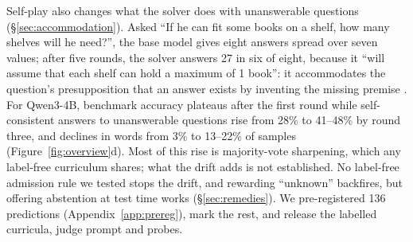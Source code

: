 Self-play also changes what the solver does with unanswerable questions (\S\ref{sec:accommodation}). Asked ``If he can fit some books on a shelf, how many shelves will he need?'', the base model gives eight answers spread over seven values; after five rounds, the solver answers 27 in six of eight, because it ``will assume that each shelf can hold a maximum of 1 book'': it accommodates the question's presupposition that an answer exists by inventing the missing premise \citep{lewis1979scorekeeping}. For Qwen3-4B, benchmark accuracy plateaus after the first round while self-consistent answers to unanswerable questions rise from 28\% to 41--48\% by round three, and declines in words from 3\% to 13--22\% of samples (Figure~\ref{fig:overview}d). Most of this rise is majority-vote sharpening, which any label-free curriculum shares; what the drift adds is not established. No label-free admission rule we tested stops the drift, and rewarding ``unknown'' backfires, but offering abstention at test time works (\S\ref{sec:remedies}). We pre-registered 136 predictions (Appendix~\ref{app:prereg}), mark the rest, and release the labelled curricula, judge prompt and probes.
